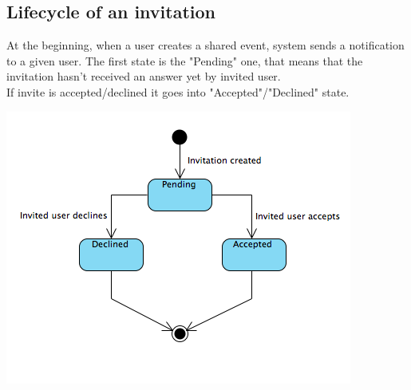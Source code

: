 \documentclass[12pt]{book}
\begin{document}
\subsection{Lifecycle of an invitation}
At the beginning, when a user creates a shared event, system sends a notification to a given user. The first state is the "Pending" one, that means that the invitation hasn't received an answer yet by invited user. \\
If invite is accepted/declined it goes into "Accepted"/"Declined" state.\\  
\begin{center}
\includegraphics[scale=0.8]{invitationSCD}\\
\end{center}
\end{document}
